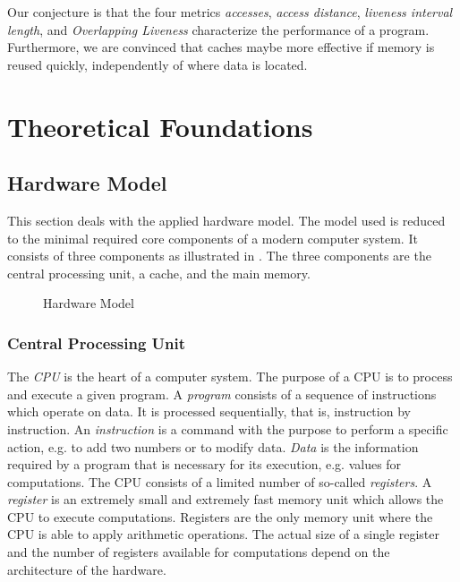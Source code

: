 \documentclass[onecolumn, openright, master, english, signatures]{dbrgrptt}
\begin{document}
Our conjecture is that the four metrics \emph{accesses}, \emph{access distance}, \emph{liveness interval length}, and \emph{Overlapping Liveness} characterize the performance of a program.
Furthermore, we are convinced that caches maybe more effective if memory is reused quickly, independently of where data is located.



\chapter{Theoretical Foundations}\label{cha:theoretical-foundations}


\section{Hardware Model}\label{sec:hardware-model}

This section deals with the applied hardware model. The model used is reduced to the minimal required core components of a modern computer system. It consists of three components as illustrated in . The three components are the central processing unit, a cache, and the main memory.

\begin{figure}[!ht]
  \centering
  
  \caption{Hardware Model}
  \label{fig:hardware-model}
\end{figure}

\subsection{Central Processing Unit}
The \emph{\ac{CPU}} is the heart of a computer system. The purpose of a \ac{CPU} is to process and execute a given program. A \emph{program} consists of a sequence of instructions which operate on data. It is processed sequentially, that is, instruction by instruction. An \emph{instruction} is a command with the purpose to perform a specific action, e.g. to add two numbers or to modify data. \emph{Data} is the information required by a program that is necessary for its execution, e.g. values for computations. The \ac{CPU} consists of a limited number of so-called \emph{registers}. A \emph{register} is an extremely small and extremely fast memory unit which allows the \ac{CPU} to execute computations. Registers are the only memory unit where the \ac{CPU} is able to apply arithmetic operations. The actual size of a single register and the number of registers available for computations depend on the architecture of the hardware.
\end{document}
